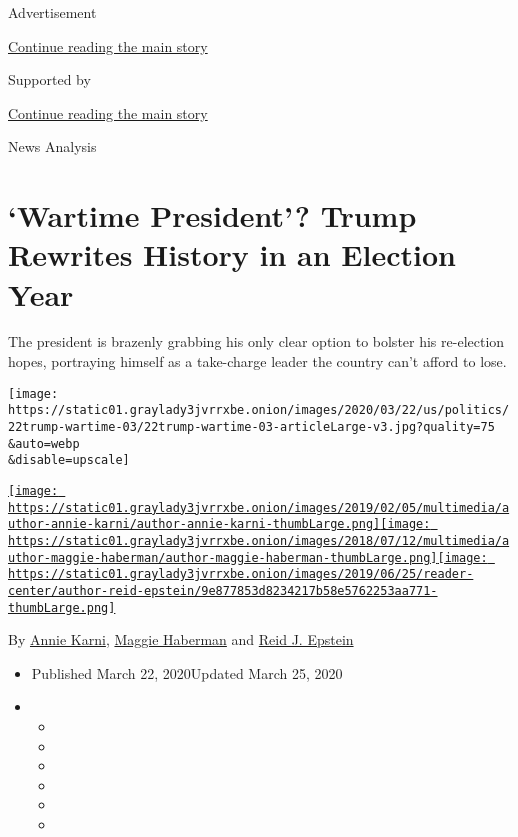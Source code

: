 Advertisement

\protect\hyperlink{after-top}{Continue reading the main story}

Supported by

\protect\hyperlink{after-sponsor}{Continue reading the main story}

News Analysis

\hypertarget{wartime-president-trump-rewrites-history-in-an-election-year}{%
\section{`Wartime President'? Trump Rewrites History in an Election
Year}\label{wartime-president-trump-rewrites-history-in-an-election-year}}

The president is brazenly grabbing his only clear option to bolster his
re-election hopes, portraying himself as a take-charge leader the
country can't afford to lose.

\texttt{[image: https://static01.graylady3jvrrxbe.onion/images/2020/03/22/us/politics/22trump-wartime-03/22trump-wartime-03-articleLarge-v3.jpg?quality=75\\\&auto=webp\\\&disable=upscale]}

\href{https://www.nytimes3xbfgragh.onion/by/annie-karni}{\texttt{[image: https://static01.graylady3jvrrxbe.onion/images/2019/02/05/multimedia/author-annie-karni/author-annie-karni-thumbLarge.png]}}\href{https://www.nytimes3xbfgragh.onion/by/maggie-haberman}{\texttt{[image: https://static01.graylady3jvrrxbe.onion/images/2018/07/12/multimedia/author-maggie-haberman/author-maggie-haberman-thumbLarge.png]}}\href{https://www.nytimes3xbfgragh.onion/by/reid-j-epstein}{\texttt{[image: https://static01.graylady3jvrrxbe.onion/images/2019/06/25/reader-center/author-reid-epstein/9e877853d8234217b58e5762253aa771-thumbLarge.png]}}

By \href{https://www.nytimes3xbfgragh.onion/by/annie-karni}{Annie
Karni},
\href{https://www.nytimes3xbfgragh.onion/by/maggie-haberman}{Maggie
Haberman} and
\href{https://www.nytimes3xbfgragh.onion/by/reid-j-epstein}{Reid J.
Epstein}

\begin{itemize}
\item
  Published March 22, 2020Updated March 25, 2020
\item
  \begin{itemize}
  \item
  \item
  \item
  \item
  \item
  \item
  \end{itemize}
\end{itemize}

